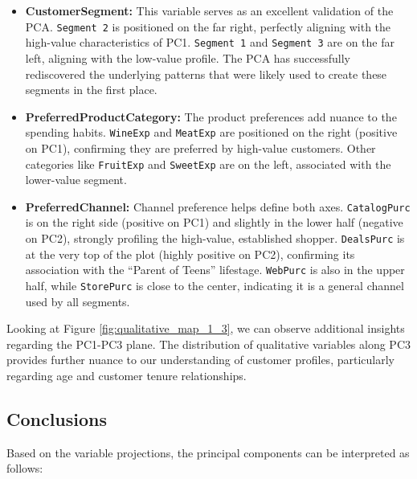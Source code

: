 \begin{itemize}
    \item \textbf{CustomerSegment:} This variable serves as an excellent validation of the PCA. \texttt{Segment 2} is positioned on the far right, perfectly aligning with the high-value characteristics of PC1. \texttt{Segment 1} and \texttt{Segment 3} are on the far left, aligning with the low-value profile. The PCA has successfully rediscovered the underlying patterns that were likely used to create these segments in the first place.
    
    \item \textbf{PreferredProductCategory:} The product preferences add nuance to the spending habits. \texttt{WineExp} and \texttt{MeatExp} are positioned on the right (positive on PC1), confirming they are preferred by high-value customers. Other categories like \texttt{FruitExp} and \texttt{SweetExp} are on the left, associated with the lower-value segment.
    
    \item \textbf{PreferredChannel:} Channel preference helps define both axes. \texttt{CatalogPurc} is on the right side (positive on PC1) and slightly in the lower half (negative on PC2), strongly profiling the high-value, established shopper. \texttt{DealsPurc} is at the very top of the plot (highly positive on PC2), confirming its association with the ``Parent of Teens'' lifestage. \texttt{WebPurc} is also in the upper half, while \texttt{StorePurc} is close to the center, indicating it is a general channel used by all segments.
\end{itemize}

Looking at Figure \ref{fig:qualitative_map_1_3}, we can observe additional insights regarding the PC1-PC3 plane. The distribution of qualitative variables along PC3 provides further nuance to our understanding of customer profiles, particularly regarding age and customer tenure relationships.


\subsection{Conclusions}

Based on the variable projections, the principal components can be interpreted as follows:

